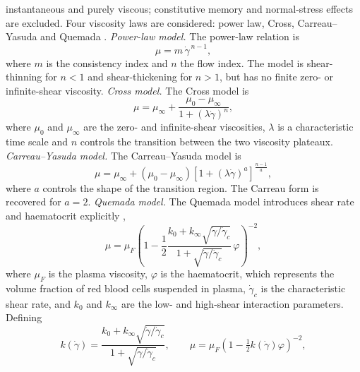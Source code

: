 \documentclass[lineno]{jfm}
\begin{document}
instantaneous and purely viscous; constitutive memory and normal-stress effects
are excluded.
Four viscosity laws are considered: power law, Cross, Carreau--Yasuda and
Quemada \citep{Quemada1977,Popel2005,Neofytou2004,Mimouni2016}.
\medskip
\noindent\textit{Power-law model.}
The power-law relation is
\begin{equation}
\mu
=
m\,\dot{\gamma}^{\,n-1},
\label{eq:pl}
\end{equation}
where $m$ is the consistency index and $n$ the flow index. The model is
shear-thinning for $n<1$ and shear-thickening for $n>1$, but has no finite
zero- or infinite-shear viscosity.
\medskip
\noindent\textit{Cross model.}
The Cross model \citep{Cross1965} is
\begin{equation}
\mu
=
\mu_{\infty}
+
\frac{\mu_{0}-\mu_{\infty}}
{1+(\lambda\dot{\gamma})^{n}},
\label{eq:cross}
\end{equation}
where $\mu_0$ and $\mu_\infty$ are the zero- and infinite-shear viscosities,
$\lambda$ is a characteristic time scale and $n$ controls the transition
between the two viscosity plateaux.
\medskip
\noindent\textit{Carreau--Yasuda model.}
The Carreau--Yasuda model \citep{Carreau1972,Yasuda1981} is
\begin{equation}
\mu
=
\mu_{\infty}
+
(\mu_{0}-\mu_{\infty})
\left[
1+(\lambda\dot{\gamma})^{a}
\right]^{\frac{n-1}{a}},
\label{eq:carreau-yasuda}
\end{equation}
where $a$ controls the shape of the transition region. The Carreau form is
recovered for $a=2$.
\medskip
\noindent\textit{Quemada model.}
The Quemada model introduces shear rate and haematocrit explicitly
\citep{Quemada1977,Popel2005},
\begin{equation}
\mu
=
\mu_{F}
\left(
1-\frac{1}{2}
\frac{
k_{0}
+k_{\infty}
\sqrt{\dot{\gamma}/\dot{\gamma}_{c}}
}{
1+\sqrt{\dot{\gamma}/\dot{\gamma}_{c}}
}
\,\varphi
\right)^{-2},
\label{eq:quemada}
\end{equation}
where $\mu_F$ is the plasma viscosity, $\varphi$ is the haematocrit, which
represents the volume fraction of red blood cells suspended in plasma,
$\dot{\gamma}_c$ is the characteristic shear rate, and $k_0$ and
$k_\infty$ are the low- and high-shear interaction parameters. Defining
\begin{equation}
k(\dot\gamma)
=
\frac{
k_{0}
+k_{\infty}
\sqrt{\dot{\gamma}/\dot{\gamma}_{c}}
}{
1+\sqrt{\dot{\gamma}/\dot{\gamma}_{c}}
},
\qquad
\mu
=
\mu_F
\left(
1-\tfrac12 k(\dot\gamma)\varphi
\right)^{-2},
\label{eq:quemada_k}
\end{equation}
\end{document}
